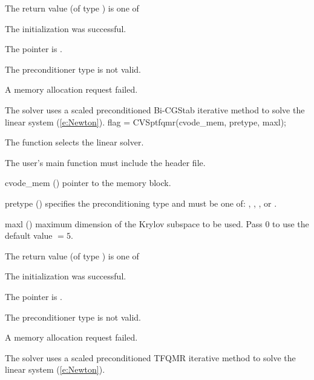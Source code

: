 {
  The return value  (of type ) is one of
  \begin{args}
  \item[\Id{CVSPBCG\_SUCCESS}] 
    The {\cvspbcg} initialization was successful.
  \item[\Id{CVSPBCG\_MEM\_NULL}]
    The  pointer is .
  \item[\Id{CVSPBCG\_ILL\_INPUT}]
    The preconditioner type  is not valid.
  \item[\Id{CVSPBCG\_MEM\_FAIL}]
    A memory allocation request failed.
  \end{args}
}
{
  The {\cvspbcg} solver uses a scaled preconditioned Bi-CGStab
  iterative method to solve the linear system (\ref{e:Newton}).
}
{
  flag = CVSptfqmr(cvode\_mem, pretype, maxl);
}
{
  The function  selects the {\cvsptfqmr} linear solver. 

  The user's main function must include the  header file.
}
{
  \begin{args}
  \item[cvode\_mem] ()
    pointer to the {\cvodes} memory block.
  \item[pretype] ()
    specifies the preconditioning type and must be one of: 
    , , , or .
  \item[maxl] ()
    maximum dimension of the Krylov subspace to be used. Pass $0$ to use the 
    default value  $= 5$.
  \end{args}
}
{
  The return value  (of type ) is one of
  \begin{args}
  \item[\Id{CVSPTFQMR\_SUCCESS}] 
    The {\cvsptfqmr} initialization was successful.
  \item[\Id{CVSPTFQMR\_MEM\_NULL}]
    The  pointer is .
  \item[\Id{CVSPTFQMR\_ILL\_INPUT}]
    The preconditioner type  is not valid.
  \item[\Id{CVSPTFQMR\_MEM\_FAIL}]
    A memory allocation request failed.
  \end{args}
}
{
  The {\cvsptfqmr} solver uses a scaled preconditioned TFQMR
  iterative method to solve the linear system (\ref{e:Newton}).
}


